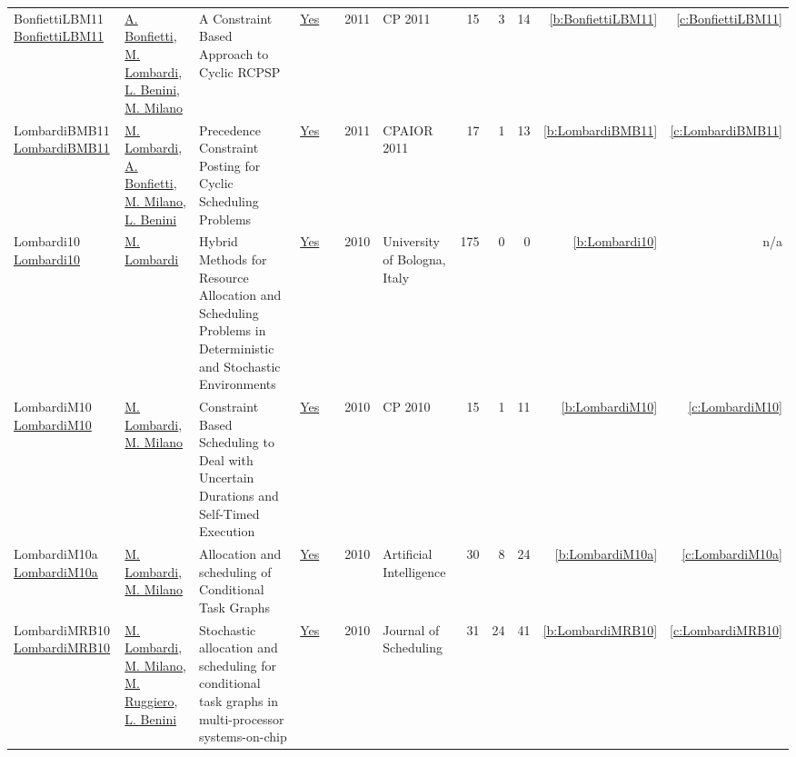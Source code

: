 {\begin{longtable}{>{\raggedright\arraybackslash}p{3cm}>{\raggedright\arraybackslash}p{6cm}>{\raggedright\arraybackslash}p{6.5cm}rrrp{2.5cm}rrrrr}
BonfiettiLBM11 \href{https://doi.org/10.1007/978-3-642-23786-7\_12}{BonfiettiLBM11} & \hyperref[auth:a204]{A. Bonfietti}, \hyperref[auth:a143]{M. Lombardi}, \hyperref[auth:a248]{L. Benini}, \hyperref[auth:a144]{M. Milano} & A Constraint Based Approach to Cyclic {RCPSP} & \href{../works/BonfiettiLBM11.pdf}{Yes} & \cite{BonfiettiLBM11} & 2011 & CP 2011 & 15 & 3 & 14 & \ref{b:BonfiettiLBM11} & \ref{c:BonfiettiLBM11}\\
LombardiBMB11 \href{https://doi.org/10.1007/978-3-642-21311-3\_14}{LombardiBMB11} & \hyperref[auth:a143]{M. Lombardi}, \hyperref[auth:a204]{A. Bonfietti}, \hyperref[auth:a144]{M. Milano}, \hyperref[auth:a248]{L. Benini} & Precedence Constraint Posting for Cyclic Scheduling Problems & \href{../works/LombardiBMB11.pdf}{Yes} & \cite{LombardiBMB11} & 2011 & CPAIOR 2011 & 17 & 1 & 13 & \ref{b:LombardiBMB11} & \ref{c:LombardiBMB11}\\
Lombardi10 \href{http://amsdottorato.unibo.it/2961/}{Lombardi10} & \hyperref[auth:a143]{M. Lombardi} & Hybrid Methods for Resource Allocation and Scheduling Problems in Deterministic and Stochastic Environments & \href{../works/Lombardi10.pdf}{Yes} & \cite{Lombardi10} & 2010 & University of Bologna, Italy & 175 & 0 & 0 & \ref{b:Lombardi10} & n/a\\
LombardiM10 \href{https://doi.org/10.1007/978-3-642-15396-9\_32}{LombardiM10} & \hyperref[auth:a143]{M. Lombardi}, \hyperref[auth:a144]{M. Milano} & Constraint Based Scheduling to Deal with Uncertain Durations and Self-Timed Execution & \href{../works/LombardiM10.pdf}{Yes} & \cite{LombardiM10} & 2010 & CP 2010 & 15 & 1 & 11 & \ref{b:LombardiM10} & \ref{c:LombardiM10}\\
LombardiM10a \href{https://doi.org/10.1016/j.artint.2010.02.004}{LombardiM10a} & \hyperref[auth:a143]{M. Lombardi}, \hyperref[auth:a144]{M. Milano} & Allocation and scheduling of Conditional Task Graphs & \href{../works/LombardiM10a.pdf}{Yes} & \cite{LombardiM10a} & 2010 & Artificial Intelligence & 30 & 8 & 24 & \ref{b:LombardiM10a} & \ref{c:LombardiM10a}\\
LombardiMRB10 \href{http://dx.doi.org/10.1007/s10951-010-0184-y}{LombardiMRB10} & \hyperref[auth:a143]{M. Lombardi}, \hyperref[auth:a144]{M. Milano}, \hyperref[auth:a727]{M. Ruggiero}, \hyperref[auth:a248]{L. Benini} & Stochastic allocation and scheduling for conditional task graphs in multi-processor systems-on-chip & \href{../works/LombardiMRB10.pdf}{Yes} & \cite{LombardiMRB10} & 2010 & Journal of Scheduling & 31 & 24 & 41 & \ref{b:LombardiMRB10} & \ref{c:LombardiMRB10}\\

\end{longtable}}
